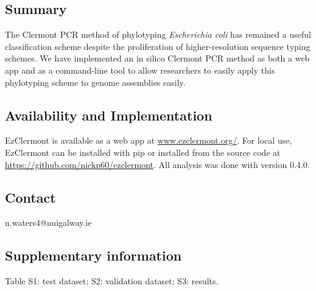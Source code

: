 
\subsection*{Summary}
The Clermont PCR method of phylotyping \textit{Escherichia coli} has remained a useful classification scheme despite the proliferation of higher-resolution sequence typing schemes.  We have implemented an in silico Clermont PCR method as both a web app and as a command-line tool to allow researchers to easily apply this phylotyping scheme to genome assemblies easily.
\subsection*{Availability and Implementation}
EzClermont is available as a web app at  \url{www.ezclermont.org/}.  For local use, EzClermont can be installed with pip or installed from the source code at \url{https://github.com/nickp60/ezclermont}. All analysis was done with version 0.4.0.
\subsection*{Contact}
n.waters4@nuigalway.ie
\subsection*{Supplementary information}
Table S1: test dataset; S2: validation dataset; S3: results.
